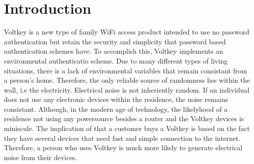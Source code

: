 \section{Introduction}

Voltkey is a new type of family WiFi access product intended to use no password authentication but retain the security and simplicity that password based authentication schemes have.
To accomplish this, Voltkey implements an environmental authenticatio scheme.
Due to many different types of living situations, there is a lack of environmental variables that remain consistant from a person's home.
Therefore, the only reliable source of randomness lies within the wall, i.e the electricity.
Electrical noise is not inheriently random.
If an individual does not use any electronic devices within the residence, the noise remains consistant.
Although, in the modern age of technology, the likelyhood of a residence not using any powersource besides a router and the Voltkey devices is miniscule.
The implication of that a customer buys a Voltkey is based on the fact they have several devices that need fast and simple connection to the internet.
Therefore, a person who uses Voltkey is much more likely to generate electrical noise from their devices.

